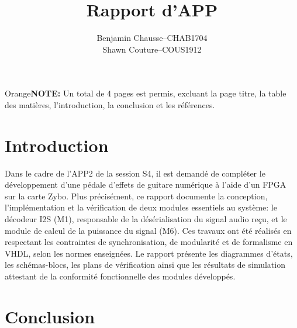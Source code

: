 \documentclass[a11paper]{article}
\title{Rapport d'APP}
\author{
  \addtolength{\tabcolsep}{-0.4em}
  \begin{tabular}{rcl} %
      Benjamin Chausse & -- & CHAB1704 \\
      Shawn Couture    & -- & COUS1912 \\
  \end{tabular}
}
\newcommand{\note}[1]{\begin{color}{Orange}\textbf{NOTE:} #1\end{color}}
\begin{document}
\maketitle
\newpage
\tableofcontents
\newpage

\note{Un total de 4 pages est permis, excluant la page titre, la table des matières, l'introduction,
la conclusion et les références.}

\section{Introduction}

Dans le cadre de l'APP2 de la session S4, il est demandé de compléter le
développement d'une pédale d'effets de guitare numérique à l'aide d'un FPGA
sur la carte Zybo. Plus précisément, ce rapport documente la conception,
l'implémentation et la vérification de deux modules essentiels au système:
le décodeur I2S (M1), responsable de la désérialisation du signal audio reçu,
et le module de calcul de la puissance du signal (M6). Ces travaux ont été
réalisés en respectant les contraintes de synchronisation, de modularité et
de formalisme en VHDL, selon les normes enseignées. Le rapport présente les
diagrammes d'états, les schémas-blocs, les plans de vérification ainsi que
les résultats de simulation attestant de la conformité fonctionnelle des
modules développés.




\section{Conclusion}
\end{document}
